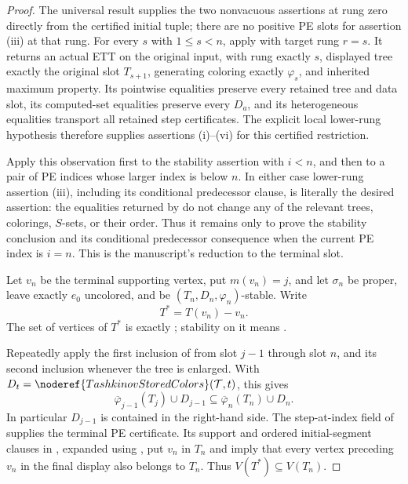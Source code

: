 \begin{proof}
The universal result  supplies the two
nonvacuous assertions at rung zero directly from the certified initial
tuple; there are no positive PE slots for assertion (iii) at that rung.
For every \(s\) with \(1\leq s<n\), apply
 with target rung \(r=s\).  It returns
an actual ETT on the original input, with rung exactly \(s\), displayed
tree exactly the original slot \(T_{s+1}\), generating coloring exactly
\(\varphi_s\), and inherited maximum property.  Its pointwise equalities
preserve every retained tree and data slot, its computed-set equalities
preserve every \(D_a\), and its heterogeneous equalities transport all
retained step certificates.  The explicit local lower-rung hypothesis
therefore supplies assertions (i)--(vi) for this certified restriction.

Apply this observation first to the stability assertion with \(i<n\), and
then to a pair of PE indices whose larger index is below \(n\).  In either
case lower-rung assertion (iii), including its conditional predecessor
clause, is literally the desired assertion: the
equalities returned by  do not change any of the relevant
trees, colorings, \(S\)-sets, or their order.  Thus it remains only to
prove the stability conclusion and its conditional predecessor consequence
when the current PE index is \(i=n\).  This is
the manuscript's reduction to the terminal slot.

Let \(v_n\) be the terminal supporting vertex, put \(m(v_n)=j\), and let
\(\sigma_n\) be proper, leave exactly \(e_0\) uncolored, and be
\((T_n,D_n,\varphi_n)\)-stable.  Write
\[
                       T^*=T(v_n)-v_n.
\]
The set of vertices of \(T^*\) is exactly
; stability on it means
.

Repeatedly apply the first inclusion of
 from slot \(j-1\) through slot \(n\),
and its second inclusion whenever the tree is enlarged.  With
\(D_t=\noderef{TashkinovStoredColors}(\mathcal T,t)\), this gives
\[
 \overline\varphi_{j-1}(T_j)\cup D_{j-1}
 \subseteq
 \overline\varphi_n(T_n)\cup D_n.                              \tag{1}
\]
In particular \(D_{j-1}\) is contained in the right-hand side.  The
step-at-index field of  supplies the terminal PE
certificate.  Its support and ordered initial-segment clauses in
, expanded using
, put \(v_n\) in \(T_n\) and imply that
every vertex preceding \(v_n\) in the final display also belongs to
\(T_n\).  Thus \(V(T^*)\subseteq V(T_n)\).


\end{proof}
